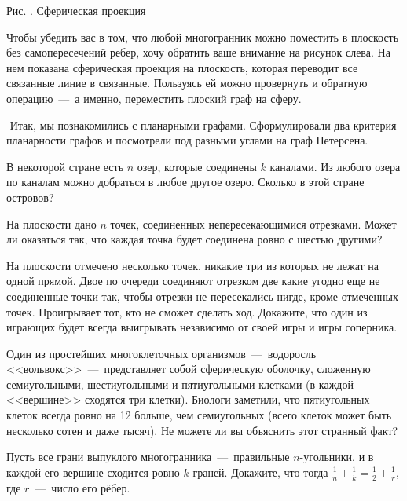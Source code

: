 \begin{paracol}{2}
\begin{center}
	\small Рис. \images. Сферическая проекция
\end{center}

\switchcolumn

	Чтобы убедить вас в том, что любой многогранник можно поместить в плоскость без самопересечений ребер, 
	хочу обратить ваше внимание на рисунок слева. На нем показана сферическая проекция на плоскость, 
	которая переводит все связанные линие в связанные. Пользуясь ей можно провернуть и обратную операцию~---~а 
	именно, переместить плоский граф на сферу.
	
$ $
\newline
	Итак, мы познакомились с планарными графами. Сформулировали два критерия планарности графов и посмотрели 
	под разными углами на граф Петерсена.
\end{paracol}
	

\begin{exersize}
	В некоторой стране есть $n$ озер, которые соединены $k$ каналами. Из любого озера по каналам можно добраться 
	в любое другое озеро. Сколько в этой стране островов?
\end{exersize}

\begin{exersize}
	На плоскости дано $n$ точек, соединенных непересекающимися отрезками. Может ли оказаться так, 
	что каждая точка будет соединена ровно с шестью другими?
\end{exersize}

\begin{exersize}
	На плоскости отмечено несколько точек, никакие три из которых не лежат на одной прямой. Двое по очереди соединяют 
	отрезком две какие угодно еще не соединенные точки так, чтобы отрезки не пересекались нигде, кроме отмеченных точек. 
	Проигрывает тот, кто не сможет сделать ход. Докажите, что один из играющих будет всегда выигрывать независимо от своей игры и игры соперника.
\end{exersize}

\begin{exersize}
	Один из простейших многоклеточных организмов~---~водоросль <<вольвокс>>~---~представляет собой сферическую оболочку, 
	сложенную семиугольными, шестиугольными и пятиугольными клетками (в каждой <<вершине>> сходятся три клетки). 
	Биологи заметили, что пятиугольных клеток всегда ровно на 12 больше, чем семиугольных (всего клеток может быть несколько сотен и даже тысяч). 
	Не можете ли вы объяснить этот странный факт?
\end{exersize}

\begin{exersize}
	Пусть все грани выпуклого многогранника~---~правильные $n$-угольники, и в каждой его вершине сходится ровно $k$ граней. 
	Докажите, что тогда $\frac{1}{n} + \frac{1}{k} = \frac{1}{2} + \frac{1}{r}$, где $r$~---~число его рёбер.
\end{exersize}

